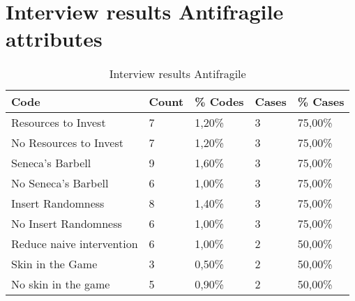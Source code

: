 \section{Interview results Antifragile attributes}
\label{sec:interviewresultsantifragile}
\begin{table}[H]
	\centering
	\begin{tabular}{lllll}
		\toprule
		\textbf{Code} & \textbf{Count} & \textbf{\% Codes} & \textbf{Cases} & \textbf{\% Cases} \\
		\midrule
		Resources to Invest & 7     & 1,20\% & 3     & 75,00\% \\
		No Resources to Invest & 7     & 1,20\% & 3     & 75,00\% \\
		Seneca's Barbell & 9     & 1,60\% & 3     & 75,00\% \\
		No Seneca's Barbell & 6     & 1,00\% & 3     & 75,00\% \\
		Insert Randomness & 8     & 1,40\% & 3     & 75,00\% \\
		No Insert Randomness & 6     & 1,00\% & 3     & 75,00\% \\
		Reduce naive intervention & 6     & 1,00\% & 2     & 50,00\% \\
		Skin in the Game & 3     & 0,50\% & 2     & 50,00\% \\
		No skin in the game & 5     & 0,90\% & 2     & 50,00\% \\
		\bottomrule
	\end{tabular}%
	\caption{Interview results Antifragile}
	\label{tab:interviewresultsantifragile}%
\end{table}%
